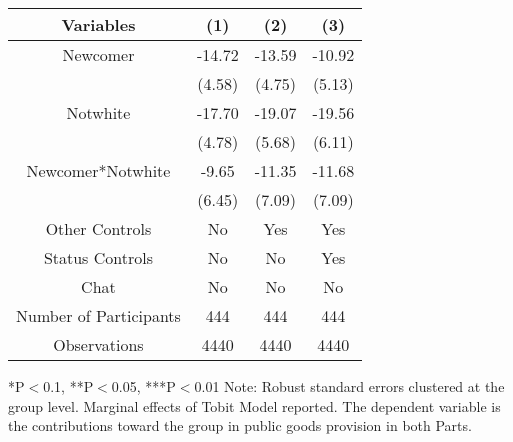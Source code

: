\begin{table}[htbp]
    \begin{tabular}{c c c c}
    \toprule
    \textbf{Variables} & \textbf{(1)} & \textbf{(2)} & \textbf{(3)}       \\ 
\midrule
Newcomer                         &     -14.72\sym{***} &     -13.59\sym{***}  &  -10.92\sym{*}   \\
                                 &     (4.58)          &     (4.75)          &  (5.13)             \\
Notwhite                         &  -17.70\sym{***} &     -19.07\sym{***}  &  -19.56\sym{***}   \\
                                 &     (4.78)          &     (5.68)          &  (6.11)             \\
Newcomer*Notwhite              &     -9.65              &     -11.35\sym{*}  &  -11.68\sym{*}   \\
                                 &     (6.45)          &     (7.09)          &  (7.09)             \\


\midrule
Other Controls                   &    No               &    Yes              &    Yes            \\
Status Controls                    &    No               &    No               &    Yes           \\
Chat                             &    No               &    No               &    No             \\
\midrule
Number of Participants           &    444               &    444              &    444               \\
\midrule
Observations                     &       4440          &       4440          &  4440            \\
\bottomrule

\end{tabular}
\begin{footnotesize}
\newline
*P$<$0.1, **P$<$0.05, ***P$<$0.01
\newline
Note: Robust standard errors clustered at the group level. Marginal effects of Tobit Model reported. 
\newline
The dependent variable is the contributions toward the group in public goods provision in both Parts. 
\end{footnotesize}
\end{table}